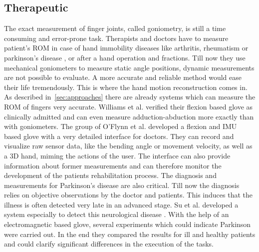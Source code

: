 \subsection{Therapeutic} \label{subsec:applications:reha}
The exact measurement of finger joints, called goniometry, is still a time consuming and error-prone task. Therapists and doctors have to measure patient's \ac{ROM} in case of hand immobility diseases like arthritis, rheumatism \cite{o2013novel} or parkinson's disease \cite{su20033}, or after a hand operation and fractions. Till now they use mechanical goniometers \cite{williams2000goniometric} to measure static angle positions, dynamic measurements are not possible to evaluate. A more accurate and reliable method would ease their life tremendously. This is where the hand motion reconstruction comes in. As described in~\ref{sec:approaches} there are already systems which can measure the \ac{ROM} of fingers very accurate. Williams et al. \cite{williams2000goniometric} verified their flexion based glove as clinically admitted and can even measure adduction-abduction more exactly than with goniometers. The group of O'Flynn et al. \cite{o2013novel} developed a flexion and \ac{IMU} based glove with a very detailed interface for doctors. They can record and visualize raw sensor data, like the bending angle or movement velocity, as well as a 3D hand, miming the actions of the user. The interface can also provide information about former measurements and can therefore monitor the development of the patients rehabilitation process. The diagnosis and measurements for Parkinson's disease are also critical. Till now the diagnosis relies on objective observations by the doctor and patients. This induces that the illness is often detected very late in an advanced stage. Su et al. \cite{su20033} developed a system especially to detect this neurological disease \cite{su20033}. With the help of an electromagnetic based glove, several experiments which could indicate Parkinson were carried out. In the end they compared the results for ill and healthy patients and could clarify significant differences in the execution of the tasks.\\
